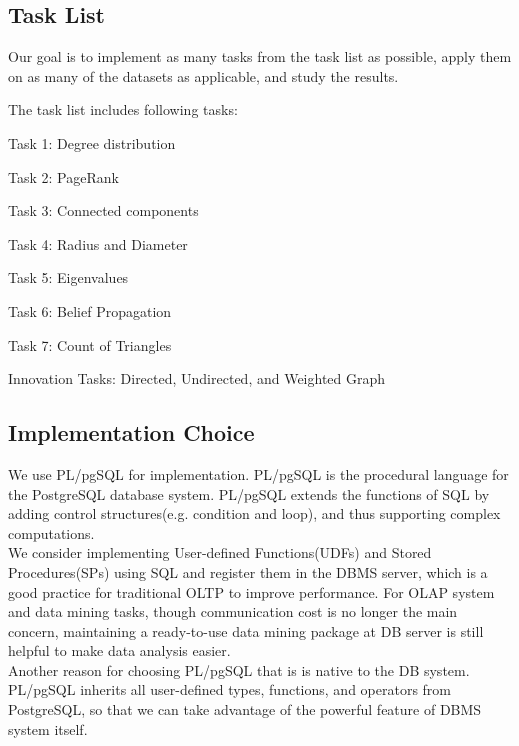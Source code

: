 \subsection{Task List}
Our goal is to implement as many tasks from the task list as possible, apply them on as many of the datasets as applicable, and study the results.

The task list includes following tasks:
\bit
\item Task 1: Degree distribution
\item Task 2: PageRank
\item Task 3: Connected components
\item Task 4: Radius and Diameter
\item Task 5: Eigenvalues
\item Task 6: Belief Propagation
\item Task 7: Count of Triangles
\item Innovation Tasks: Directed, Undirected, and Weighted Graph
\eit

\subsection{Implementation Choice}
We use PL/pgSQL for implementation. PL/pgSQL is the procedural language for the PostgreSQL database system. PL/pgSQL extends the functions of SQL by adding control structures(e.g. condition and loop), and thus supporting complex computations. \\
We consider implementing User-defined Functions(UDFs) and Stored Procedures(SPs) using SQL and register them in the DBMS server, which is a good practice for traditional OLTP to improve performance. For OLAP system and data mining tasks, though communication cost is no longer the main concern, maintaining a ready-to-use data mining package at DB server is still helpful to make data analysis easier. \\
Another reason for choosing PL/pgSQL that is is native to the DB system. PL/pgSQL inherits all user-defined types, functions, and operators from PostgreSQL, so that we can take advantage of the powerful feature of DBMS system itself. 

